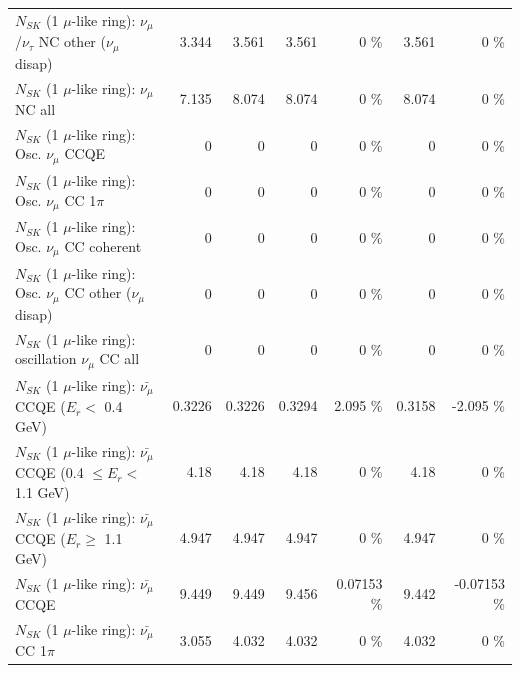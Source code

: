 \begin{table}
\begin{tabular}{| l | r | r | r  r | r  r |}
   $N_{SK}$ (1 $\mu$-like ring): $\nu_\mu$/$\nu_\tau$ NC other ($\nu_\mu$ disap) &           3.344 &           3.561 &           3.561 &        0 \%  &           3.561 &        0 \%  \\ 
                                $N_{SK}$ (1 $\mu$-like ring): $\nu_{\mu}$ NC all &           7.135 &           8.074 &           8.074 &        0 \%  &           8.074 &        0 \%  \\ 
\hline
\hline
                               $N_{SK}$ (1 $\mu$-like ring): Osc. $\nu_\mu$ CCQE &               0 &               0 &               0 &        0 \%  &               0 &        0 \%  \\ 
                          $N_{SK}$ (1 $\mu$-like ring): Osc. $\nu_\mu$ CC 1$\pi$ &               0 &               0 &               0 &        0 \%  &               0 &        0 \%  \\ 
                        $N_{SK}$ (1 $\mu$-like ring): Osc. $\nu_\mu$ CC coherent &               0 &               0 &               0 &        0 \%  &               0 &        0 \%  \\ 
         $N_{SK}$ (1 $\mu$-like ring): Osc. $\nu_\mu$ CC other ($\nu_\mu$ disap) &               0 &               0 &               0 &        0 \%  &               0 &        0 \%  \\ 
                      $N_{SK}$ (1 $\mu$-like ring): oscillation $\nu_\mu$ CC all &               0 &               0 &               0 &        0 \%  &               0 &        0 \%  \\ 
\hline
\hline
          $N_{SK}$ (1 $\mu$-like ring): $\bar{\nu_\mu}$ CCQE ($E_{r} <$ 0.4 GeV) &          0.3226 &          0.3226 &          0.3294 &    2.095 \%  &          0.3158 &   -2.095 \%  \\ 
 $N_{SK}$ (1 $\mu$-like ring): $\bar{\nu_\mu}$ CCQE (0.4 $\leq E_{r} <$ 1.1 GeV) &            4.18 &            4.18 &            4.18 &        0 \%  &            4.18 &        0 \%  \\ 
       $N_{SK}$ (1 $\mu$-like ring): $\bar{\nu_\mu}$ CCQE ($E_{r} \geq$ 1.1 GeV) &           4.947 &           4.947 &           4.947 &        0 \%  &           4.947 &        0 \%  \\ 
\hline
                              $N_{SK}$ (1 $\mu$-like ring): $\bar{\nu_\mu}$ CCQE &           9.449 &           9.449 &           9.456 &  0.07153 \%  &           9.442 & -0.07153 \%  \\ 
                         $N_{SK}$ (1 $\mu$-like ring): $\bar{\nu_\mu}$ CC 1$\pi$ &           3.055 &           4.032 &           4.032 &        0 \%  &           4.032 &        0 \%  \\ 

\end{tabular}
\end{table}
